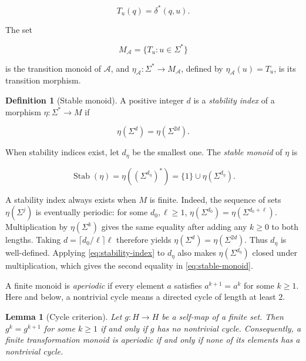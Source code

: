 \documentclass[10pt]{article}
\newtheorem{lemma}[theorem]{Lemma}
\theoremstyle{definition}
\newtheorem{definition}[theorem]{Definition}
\newcommand{\Stab}{\operatorname{Stab}}
\begin{document}
\begin{equation}
 T_u(q)=\delta^*(q,u).
\end{equation}

The set

\begin{equation}
 M_{\mathcal A}=\{T_u:u\in\Sigma^*\}
\end{equation}

is the transition monoid of $\mathcal A$, and
$\eta_{\mathcal A}:\Sigma^*\to M_{\mathcal A}$, defined by
$\eta_{\mathcal A}(u)=T_u$, is its transition morphism.

\begin{definition}[Stable monoid]
A positive integer $d$ is a \emph{stability index} of a morphism
$\eta:\Sigma^*\to M$ if

\begin{equation}
 \eta(\Sigma^d)=\eta(\Sigma^{2d}).
 \label{eq:stability-index}
\end{equation}

When stability indices exist, let $d_\eta$ be the smallest one.  The
\emph{stable monoid} of $\eta$ is

\begin{equation}
 \Stab(\eta)
 =\eta((\Sigma^{d_\eta})^*)
 =\{1\}\cup\eta(\Sigma^{d_\eta}).
 \label{eq:stable-monoid}
\end{equation}
\end{definition}

A stability index always exists when $M$ is finite.  Indeed, the sequence of
sets $\eta(\Sigma^j)$ is eventually periodic: for some $d_0,\ell\ge1$,
$\eta(\Sigma^{d_0})=\eta(\Sigma^{d_0+\ell})$.  Multiplication by
$\eta(\Sigma^k)$ gives the same equality after adding any $k\ge0$ to both
lengths.  Taking $d=\lceil d_0/\ell\rceil\ell$ therefore yields
$\eta(\Sigma^d)=\eta(\Sigma^{2d})$.  Thus $d_\eta$ is well-defined.
Applying \eqref{eq:stability-index} to $d_\eta$ also makes
$\eta(\Sigma^{d_\eta})$ closed under multiplication, which gives the second
equality in \eqref{eq:stable-monoid}.

A finite monoid is \emph{aperiodic} if every element $a$ satisfies
$a^{k+1}=a^k$ for some $k\ge1$.  Here and below, a nontrivial cycle means a
directed cycle of length at least $2$.

\begin{lemma}[Cycle criterion]
Let $g:H\to H$ be a self-map of a finite set.  Then $g^k=g^{k+1}$ for some
$k\ge1$ if and only if $g$ has no nontrivial cycle.  Consequently, a finite
transformation monoid is aperiodic if and only if none of its elements has a
nontrivial cycle.
\end{lemma}
\end{document}
